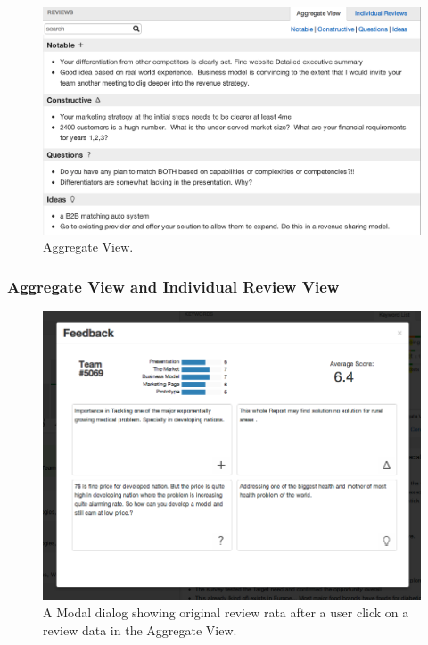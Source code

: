 \documentclass{sigchi}
\begin{document}
\begin{figure}[]
\centering
\includegraphics[width=1.4\columnwidth]{images/aggregate-view}
\caption{Aggregate View.}
\label{fig:aggregate-view}
\end{figure}

\subsubsection{Aggregate View and Individual Review View}


\begin{figure}[]
\centering
\includegraphics[width=1.4\columnwidth]{images/modal}
\caption{A Modal dialog showing original review rata after
 a user click on a review data in the Aggregate View.}
\label{fig:modal}
\end{figure}
\end{document}
